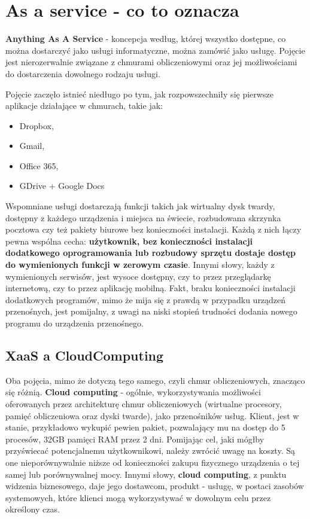 \section{As a service - co to oznacza}
\label{chapter:monitoring_architecture:xaas}

\textbf{Anything As A Service} - koncepcja według, której wszystko dostępne, co można dostarczyć
jako usługi informatyczne, można zamówić jako usługę. Pojęcie jest nierozerwalnie związane z chmurami
obliczeniowymi oraz jej możliwościami do dostarczenia dowolnego rodzaju usługi.

Pojęcie zaczęło istnieć niedługo po tym, jak rozpowszechniły się pierwsze aplikacje działające w chmurach, takie jak:
\begin{itemize}
    \item Dropbox,
    \item Gmail,
    \item Office 365,
    \item GDrive + Google Docs
   \end{itemize}
Wspomniane usługi dostarczają funkcji takich jak wirtualny dysk twardy, dostępny z każdego urządzenia i miejsca na świecie,
rozbudowana skrzynka pocztowa czy też pakiety biurowe bez konieczności instalacji.
Każdą z nich łączy pewna wspólna cecha: \textbf{użytkownik, bez konieczności instalacji dodatkowego oprogramowania lub rozbudowy sprzętu dostaje dostęp do wymienionych funkcji w zerowym czasie}. Innymi słowy, każdy z wymienionych serwisów,
jest wysoce dostępny, czy to przez przeglądarkę internetową, czy to przez aplikację mobilną. Fakt, braku konieczności instalacji dodatkowych programów, mimo że mija się z prawdą w przypadku urządzeń przenośnych, jest pomijalny, z uwagi na niski stopień
trudności dodania nowego programu do urządzenia przenośnego. 

\subsection{XaaS a CloudComputing}
Oba pojęcia, mimo że dotyczą tego samego, czyli chmur obliczeniowych, znacząco się różnią. \textbf{Cloud computing} - ogólnie, wykorzystywania możliwości
oferowanych przez architekturę chmur obliczeniowych (wirtualne procesory, pamięć obliczeniowa oraz dyski twarde), 
jako przenośników usług. Klient, jest w stanie, przykładowo wykupić pewien pakiet, pozwalający mu na dostęp do 5 procesów, 
32GB pamięci RAM przez 2 dni. Pomijając cel, jaki mógłby przyświecać potencjalnemu użytkownikowi, należy zwrócić uwagę na koszty. 
Są one nieporównywalnie niższe od konieczności zakupu fizycznego urządzenia
o tej samej lub porównywalnej mocy. Innymi słowy, \textbf{cloud computing}, 
z punktu widzenia biznesowego, daje jego dostawcom, produkt - usługę, w postaci zasobów 
systemowych, które klienci mogą wykorzystywać w dowolnym celu przez określony czas.

